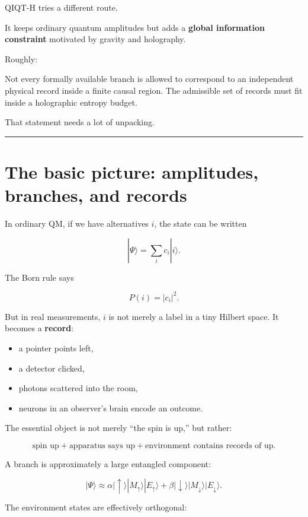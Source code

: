 \documentclass[11pt,a4paper]{article}
\newenvironment{qiqtquote}{\begin{mdframed}[style=quotestyle]}{\end{mdframed}}
\begin{document}
QIQT-H tries a different route.

It keeps ordinary quantum amplitudes but adds a \textbf{global information constraint} motivated by gravity and holography.

Roughly:

\begin{qiqtquote}
Not every formally available branch is allowed to correspond to an independent physical record inside a finite causal region. The admissible set of records must fit inside a holographic entropy budget.
\end{qiqtquote}

That statement needs a lot of unpacking.

\medskip\hrule\medskip

\section{The basic picture: amplitudes, branches, and records}

In ordinary QM, if we have alternatives $i$, the state can be written

\[
|\Psi\rangle = \sum_i c_i |i\rangle.
\]

The Born rule says

\[
P(i)=|c_i|^2.
\]

But in real measurements, $i$ is not merely a label in a tiny Hilbert space. It becomes a \textbf{record}:

\begin{itemize}
  \item a pointer points left,
  \item a detector clicked,
  \item photons scattered into the room,
  \item neurons in an observer’s brain encode an outcome.
\end{itemize}

The essential object is not merely “the spin is up,” but rather:

\[
\text{spin up} + \text{apparatus says up} + \text{environment contains records of up}.
\]

A branch is approximately a large entangled component:

\[
|\Psi\rangle
\approx
\alpha |\uparrow\rangle |M_\uparrow\rangle |E_\uparrow\rangle
+
\beta |\downarrow\rangle |M_\downarrow\rangle |E_\downarrow\rangle.
\]

The environment states are effectively orthogonal:
\end{document}
